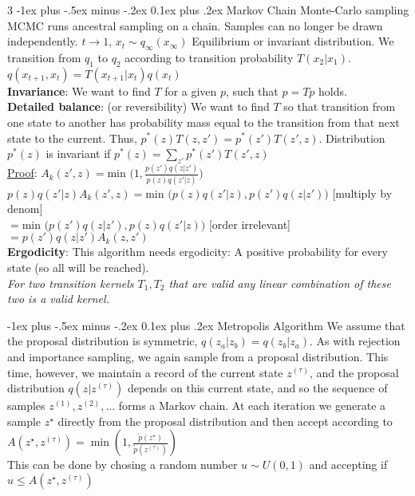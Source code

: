 \documentclass[a4paper,landscape]{amsmlaj}
\makeatletter
\renewcommand{\subsection}{\@startsection{subsection}{2}{0mm}
	{-1ex plus -.5ex minus -.2ex}
	{0.1ex plus .2ex}
	{\normalfont\normalsize\bfseries}}
\makeatother
\begin{document}
\begin{multicols*}{3}
\subsection{Markov Chain Monte-Carlo sampling}
MCMC runs ancestral sampling on a chain. Samples can no longer be drawn
independently. $t \to 1$, $x_t \sim q_{\infty}(x_{\infty})$ Equilibrium or
invariant distribution. We transition from $q_1$ to $q_2$ according to
transition probability $T(x_2|x_1)$.\\
$q(x_{t+1}, x_t) = T(x_{t+1}|x_t)q(x_t)$\\
\textbf{Invariance}: We want to find $T$ for a given $p$, such that $p=Tp$ holds.\\
\textbf{Detailed balance}: (or reversibility) We want to find $T$ so that
transition from one state to another has probability mass equal to the
transition from that next state to the current. Thus,
$p^*(z)T(z,z') = p^*(z')T(z',z)$. Distribution $p^*(z)$ is invariant if
$p^*(z)=\sum_{z'}p^*(z')T(z',z)$ \\
\underline{Proof}: $A_k(z',z) = \text{min }\big( 1,
\frac{p(z')q(z|z')}{p(z)q(z'|z)} \big)$\\
$p(z)q(z'|z)A_k(z',z) = \text{min } \big( p(z)q(z'|z),p(z')q(z|z') \big)$ [multiply by denom]\\
$= \text{min }\big(p(z')q(z|z'), p(z)q(z'|z) \big)$ [order irrelevant]\\
$= p(z')q(z|z')A_k(z,z')$ \\
\textbf{Ergodicity}: This algorithm needs ergodicity: A positive probability for
every state (so all will be reached). \\
\textit{For two transition kernels $T_1, T_2$ that are valid any linear
combination of these two is a valid kernel.}

\subsection{Metropolis Algorithm}
We assume that the proposal distribution is symmetric, $q(z_a|z_b)=q(z_b|z_a)$.
As with rejection and importance sampling, we again sample from a proposal
distribution. This time, however, we maintain a record of the current state
$z^{(\tau)}$, and the proposal distribution $q(z|z^{(\tau)})$ depends on this
current state, and so the sequence of samples $z^{(1)},z^{(2)},\ldots$ forms a
Markov chain. At each iteration we generate a sample $z^\star$ directly from the
proposal distribution and then accept according to \\
$A(z^\star,z^{(\tau)}) = \min(1, \frac{\tilde{p}(z^\star)}{\tilde{p}(z^{(\tau)})})$ \\
This can be done by chosing a random number $u \sim U(0,1)$ and accepting if
$u\leq A(z^\star,z^{(\tau)})$


\end{multicols*}
\end{document}
